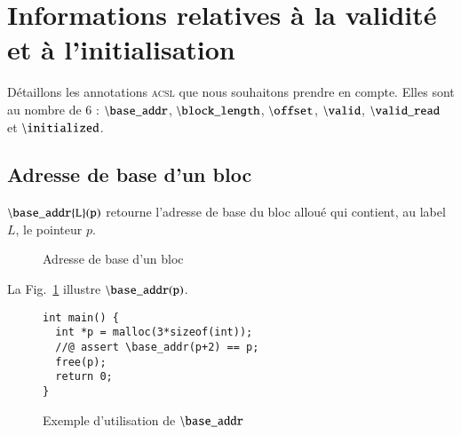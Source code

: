 \documentclass[french]{spimufcphdthesis}
\begin{document}



\section{Informations relatives à la validité et à l'initialisation}


Détaillons les annotations \textsc{acsl} que nous souhaitons prendre en compte.
Elles sont au nombre de 6 : ${\tt \backslash base\_addr}$,
${\tt \backslash block\_length}$, ${\tt \backslash offset}$,
${\tt \backslash valid}$, ${\tt \backslash valid\_read}$ et
${\tt \backslash initialized}$.

\subsection{Adresse de base d'un bloc}

${\tt \backslash base\_addr\{L\}(p)}$ retourne l'adresse de base du bloc alloué
qui contient, au label $L$, le pointeur $p$.

\begin{figure}[h]
  \begin{center}
  \end{center}
  \caption{Adresse de base d'un bloc}
  \label{fig:base-addr}
\end{figure}

La Fig.~\ref{fig:base-addr}
illustre ${\tt \backslash base\_addr(p)}$.

\begin{figure}[h]
\begin{lstlisting}
int main() {
  int *p = malloc(3*sizeof(int));
  //@ assert \base_addr(p+2) == p;
  free(p);
  return 0;
}
\end{lstlisting}
\caption{Exemple d'utilisation de ${\tt \backslash base\_addr}$}
\label{fig:base-addr-example}
\end{figure}
\end{document}
